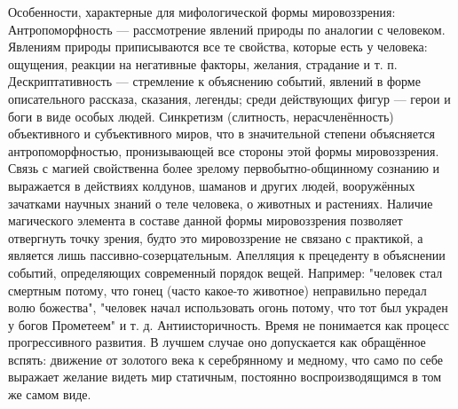 \documentclass[12pt]{article}
\begin{document}
Особенности, характерные для мифологической формы мировоззрения:
Антропоморфность  —  рассмотрение  явлений  природы  по  аналогии  с  человеком.  Явлениям  природы
приписываются все те свойства, которые есть у человека: ощущения, реакции на негативные факторы, желания,
страдание и т. п. 
Дескриптативность — стремление к объяснению событий, явлений в форме описательного рассказа, сказания,
легенды; среди действующих фигур — герои и боги в виде особых людей. 
Синкретизм (слитность, нерасчленённость) объективного и субъективного миров, что в значительной степени
объясняется антропоморфностью, пронизывающей все стороны этой формы мировоззрения. 
Связь  с  магией  свойственна  более  зрелому  первобытно-общинному  сознанию  и  выражается  в  действиях
колдунов, шаманов и других людей, вооружённых зачатками научных знаний о теле человека, о животных и
растениях. Наличие магического элемента в составе данной формы мировоззрения позволяет отвергнуть точку
зрения, будто это мировоззрение не связано с практикой, а является лишь пассивно-созерцательным. 
Апелляция  к  прецеденту  в  объяснении  событий,  определяющих  современный  порядок  вещей.  Например:
"человек стал смертным потому, что гонец (часто какое-то животное) неправильно передал волю божества",
"человек начал использовать огонь потому, что тот был украден у богов Прометеем" и т. д. 
Антиисторичность.  Время  не  понимается  как  процесс  прогрессивного  развития.  В  лучшем  случае  оно
допускается как обращённое вспять: движение от золотого века к серебрянному и медному, что само по себе
выражает желание видеть мир статичным, постоянно воспроизводящимся в том же самом виде. 

\newpage
\end{document}
